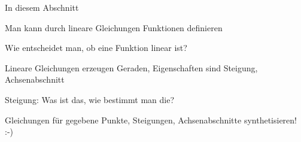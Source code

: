 \documentclass[../../main.tex]{subfiles}
\begin{document}
In diesem Abschnitt 

Man kann durch lineare Gleichungen Funktionen definieren

Wie entscheidet man, ob eine Funktion linear ist?

Lineare Gleichungen erzeugen Geraden, Eigenschaften sind Steigung, Achsenabschnitt

Steigung: Was ist das, wie bestimmt man die?

Gleichungen für gegebene Punkte, Steigungen, Achsenabschnitte synthetisieren! :-)
\end{document}

